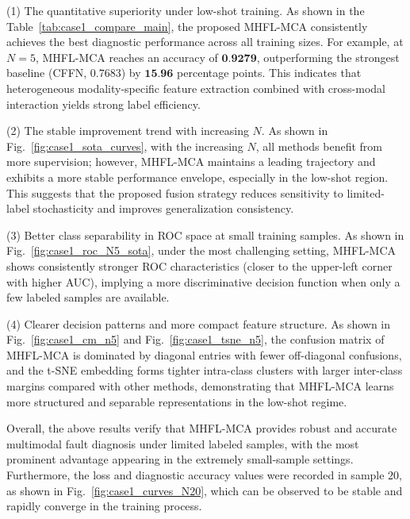 \documentclass[a4paper]{cas-sc}
\begin{document}
(1) The quantitative superiority under low-shot training. As shown in the Table~\ref{tab:case1_compare_main}, the proposed MHFL-MCA consistently achieves the best diagnostic performance across all training sizes. For example, at $N=5$, MHFL-MCA reaches an accuracy of $\textbf{0.9279}$, outperforming the strongest baseline (CFFN, $0.7683$) by $\textbf{15.96}$ percentage points. This indicates that heterogeneous modality-specific feature extraction combined with cross-modal interaction yields strong label efficiency.

(2) The stable improvement trend with increasing $N$. As shown in Fig.~\ref{fig:case1_sota_curves}, with the increasing $N$, all methods benefit from more supervision; however, MHFL-MCA maintains a leading trajectory and exhibits a more stable performance envelope, especially in the low-shot region. This suggests that the proposed fusion strategy reduces sensitivity to limited-label stochasticity and improves generalization consistency.

(3) Better class separability in ROC space at small training samples. As shown in Fig.~\ref{fig:case1_roc_N5_sota}, under the most challenging setting, MHFL-MCA shows consistently stronger ROC characteristics (closer to the upper-left corner with higher AUC), implying a more discriminative decision function when only a few labeled samples are available.

(4) Clearer decision patterns and more compact feature structure. As shown in Fig.~\ref{fig:case1_cm_n5} and Fig.~\ref{fig:case1_tsne_n5}, the confusion matrix of MHFL-MCA is dominated by diagonal entries with fewer off-diagonal confusions, and the t-SNE embedding forms tighter intra-class clusters with larger inter-class margins compared with other methods, demonstrating that MHFL-MCA learns more structured and separable representations in the low-shot regime.

Overall, the above results verify that MHFL-MCA provides robust and accurate multimodal fault diagnosis under limited labeled samples, with the most prominent advantage appearing in the extremely small-sample settings. Furthermore, the loss and diagnostic accuracy values were recorded in sample $20$, as shown in Fig.~\ref{fig:case1_curves_N20}, which can be observed to be stable and rapidly converge in the training process.
\end{document}
